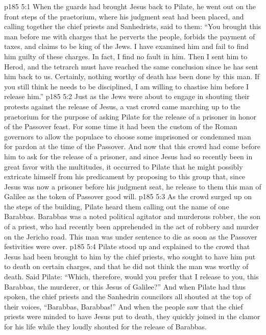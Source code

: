\vs p185 5:1 When the guards had brought Jesus back to Pilate, he went out on the front steps of the praetorium, where his judgment seat had been placed, and calling together the chief priests and Sanhedrists, said to them: “You brought this man before me with charges that he perverts the people, forbids the payment of taxes, and claims to be king of the Jews. I have examined him and fail to find him guilty of these charges. In fact, I find no fault in him. Then I sent him to Herod, and the tetrarch must have reached the same conclusion since he has sent him back to us. Certainly, nothing worthy of death has been done by this man. If you still think he needs to be disciplined, I am willing to chastise him before I release him.”
\vs p185 5:2 Just as the Jews were about to engage in shouting their protests against the release of Jesus, a vast crowd came marching up to the praetorium for the purpose of asking Pilate for the release of a prisoner in honor of the Passover feast. For some time it had been the custom of the Roman governors to allow the populace to choose some imprisoned or condemned man for pardon at the time of the Passover. And now that this crowd had come before him to ask for the release of a prisoner, and since Jesus had so recently been in great favor with the multitudes, it occurred to Pilate that he might possibly extricate himself from his predicament by proposing to this group that, since Jesus was now a prisoner before his judgment seat, he release to them this man of Galilee as the token of Passover good will.
\vs p185 5:3 As the crowd surged up on the steps of the building, Pilate heard them calling out the name of one Barabbas. Barabbas was a noted political agitator and murderous robber, the son of a priest, who had recently been apprehended in the act of robbery and murder on the Jericho road. This man was under sentence to die as soon as the Passover festivities were over.
\vs p185 5:4 Pilate stood up and explained to the crowd that Jesus had been brought to him by the chief priests, who sought to have him put to death on certain charges, and that he did not think the man was worthy of death. Said Pilate: “Which, therefore, would you prefer that I release to you, this Barabbas, the murderer, or this Jesus of Galilee?” And when Pilate had thus spoken, the chief priests and the Sanhedrin councilors all shouted at the top of their voices, “Barabbas, Barabbas!” And when the people saw that the chief priests were minded to have Jesus put to death, they quickly joined in the clamor for his life while they loudly shouted for the release of Barabbas.
